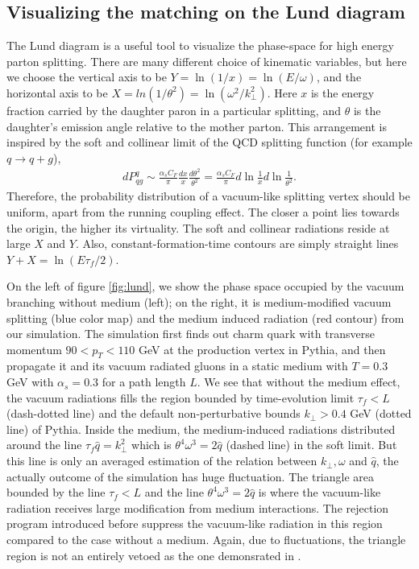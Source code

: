 \subsection{Visualizing the matching on the Lund diagram}
The Lund diagram is a useful tool to visualize the phase-space for high energy parton splitting.
There are many different choice of kinematic variables, but here we choose the vertical axis to be $Y = \ln(1/x) = \ln(E/\omega)$, and the horizontal 
axis to be $X = ln(1/\theta^2) = \ln(\omega^2/k_\perp^2)$.
Here $x$ is the energy fraction carried by the daughter paron in a particular splitting, and $\theta$ is the daughter's emission angle relative to the mother parton.
This arrangement is inspired by the soft and collinear limit of the QCD splitting function (for example $q\rightarrow q+g$),
\begin{eqnarray}
dP^{q}_{qg} \sim \frac{\alpha_s C_F}{\pi} \frac{dx}{x}\frac{d\theta^2}{\theta^2} = \frac{\alpha_s C_F}{\pi} d\ln\frac{1}{x} d\ln\frac{1}{\theta^2}.
\end{eqnarray}
Therefore, the probability distribution of a vacuum-like splitting vertex should be uniform, apart from the running coupling effect.
The closer a point lies towards the origin, the higher its virtuality.
The soft and collinear radiations reside at large $X$ and $Y$.
Also, constant-formation-time contours are simply straight lines $Y+X=\ln(E\tau_f/2)$.

On the left of figure \ref{fig:lund}, we show the phase space occupied by the vacuum branching without medium (left); on the right, it is medium-modified vacuum splitting (blue color map) and the medium induced radiation (red contour) from our simulation.
The simulation first finds out charm quark with transverse momentum $90 < p_T <110$ GeV at the production vertex in Pythia, and then propagate it and its vacuum radiated gluons in a static medium with $T=0.3$ GeV with $\alpha_s = 0.3$ for a path length $L$.
We see that without the medium effect, the vacuum radiations fills the region bounded by time-evolution limit $\tau_f < L$ (dash-dotted line) and the default non-perturbative bounds $k_\perp > 0.4$ GeV (dotted line) of Pythia. 
Inside the medium, the medium-induced radiations distributed around the line $\tau_f\hat{q} = k_\perp^2$ which is $\theta^4\omega^3 = 2\hat{q}$ (dashed line) in the soft limit.  
But this line is only an averaged estimation of the relation between $k_\perp, \omega$ and $\hat{q}$, the actually outcome of the simulation has huge fluctuation.
The triangle area bounded by the line $\tau_f < L$ and the line $\theta^4\omega^3 = 2\hat{q}$ is where the vacuum-like radiation receives large modification from medium interactions.
The rejection program introduced before suppress the vacuum-like radiation in this region compared to the case without a medium.
Again, due to fluctuations, the triangle region is not an entirely vetoed as the one demonsrated in \cite{PhysRevLett.120.232001}.

